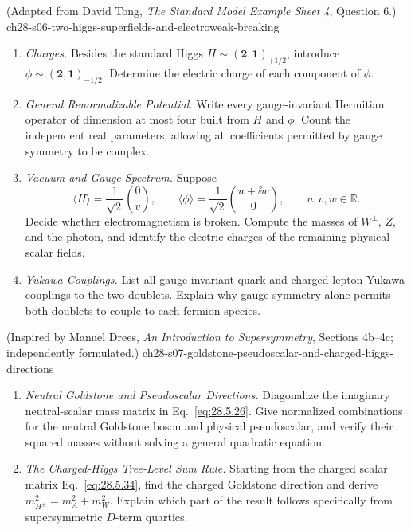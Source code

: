 \begin{enumerate}
    {(Adapted from David Tong, \emph{The Standard Model Example Sheet 4}, Question 6.)}
    {ch28-s06-two-higgs-superfields-and-electroweak-breaking}
  \begin{enumerate}
    \item \emph{Charges.}
    Besides the standard Higgs \(H\sim(\mathbf2,\mathbf{1})_{+1/2}\), introduce
      \(\phi\sim(\mathbf2,\mathbf{1})_{-1/2}\).  Determine the electric charge
      of each component of \(\phi\).
    \item \emph{General Renormalizable Potential.}
    Write every gauge-invariant Hermitian operator of dimension at most four
      built from \(H\) and \(\phi\).  Count the independent real parameters,
      allowing all coefficients permitted by gauge symmetry to be complex.
    \item \emph{Vacuum and Gauge Spectrum.}
    Suppose
      \[
        \langle H\rangle=\frac1{\sqrt2}\binom0v,\qquad
        \langle\phi\rangle=\frac1{\sqrt2}\binom{u+\ii w}0,
        \qquad u,v,w\in\mathbb R.
      \]
      Decide whether electromagnetism is broken.  Compute the masses of
      \(W^\pm\), \(Z\), and the photon, and identify the electric charges of
      the remaining physical scalar fields.
    \item \emph{Yukawa Couplings.}
    List all gauge-invariant quark and charged-lepton Yukawa couplings to the
      two doublets.  Explain why gauge symmetry alone permits both doublets to
      couple to each fermion species.
  \end{enumerate}

    {(Inspired by Manuel Drees, \emph{An Introduction to Supersymmetry}, Sections 4b--4c; independently formulated.)}
    {ch28-s07-goldstone-pseudoscalar-and-charged-higgs-directions}
  \begin{enumerate}
    \item \emph{Neutral Goldstone and Pseudoscalar Directions.}
    Diagonalize the imaginary neutral-scalar mass matrix in
      Eq.~\eqref{eq:28.5.26}.  Give normalized combinations for the neutral
      Goldstone boson and physical pseudoscalar, and verify their squared
      masses without solving a general quadratic equation.
    \item \emph{The Charged-Higgs Tree-Level Sum Rule.}
    Starting from the charged scalar matrix
      Eq.~\eqref{eq:28.5.34}, find the charged Goldstone direction and derive
      \(m_{H^\pm}^2=m_A^2+m_W^2\).  Explain which part of the result follows
      specifically from supersymmetric \(D\)-term quartics.
  \end{enumerate}


\end{enumerate}
